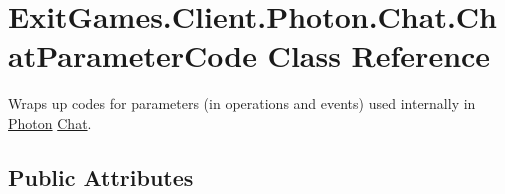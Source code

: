 \hypertarget{class_exit_games_1_1_client_1_1_photon_1_1_chat_1_1_chat_parameter_code}{}\section{Exit\+Games.\+Client.\+Photon.\+Chat.\+Chat\+Parameter\+Code Class Reference}
\label{class_exit_games_1_1_client_1_1_photon_1_1_chat_1_1_chat_parameter_code}


Wraps up codes for parameters (in operations and events) used internally in \hyperlink{namespace_exit_games_1_1_client_1_1_photon}{Photon} \hyperlink{namespace_exit_games_1_1_client_1_1_photon_1_1_chat}{Chat}.  


\subsection*{Public Attributes}
